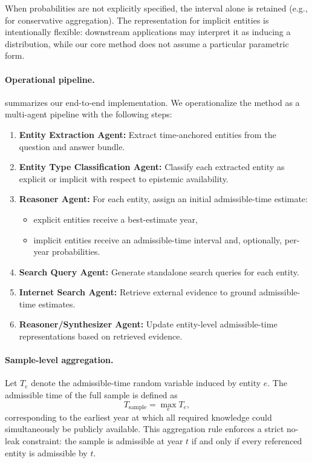 When probabilities are not explicitly specified, the interval alone is retained (e.g., for conservative aggregation). The representation for implicit entities is intentionally flexible: downstream applications may interpret it as inducing a distribution, while our core method does not assume a particular parametric form.

\paragraph{Operational pipeline.}
 summarizes our end-to-end implementation. We operationalize the method as a multi-agent pipeline with the following steps:
\begin{enumerate}
    \item \textbf{Entity Extraction Agent:} Extract time-anchored entities from the question and answer bundle.
    \item \textbf{Entity Type Classification Agent:} Classify each extracted entity as explicit or implicit with respect to epistemic availability.
    \item \textbf{Reasoner Agent:} For each entity, assign an initial admissible-time estimate:
    \begin{itemize}
        \item explicit entities receive a best-estimate year,
        \item implicit entities receive an admissible-time interval and, optionally, per-year probabilities.
    \end{itemize}
    \item \textbf{Search Query Agent:} Generate standalone search queries for each entity.
    \item \textbf{Internet Search Agent:} Retrieve external evidence to ground admissible-time estimates.
    \item \textbf{Reasoner/Synthesizer Agent:} Update entity-level admissible-time representations based on retrieved evidence.
\end{enumerate}

\paragraph{Sample-level aggregation.}
Let $T_e$ denote the admissible-time random variable induced by entity $e$. The admissible time of the full sample is defined as
\[
T_{\text{sample}} = \max_e T_e,
\]
corresponding to the earliest year at which all required knowledge could simultaneously be publicly available. This aggregation rule enforces a strict no-leak constraint: the sample is admissible at year $t$ if and only if every referenced entity is admissible by $t$.

